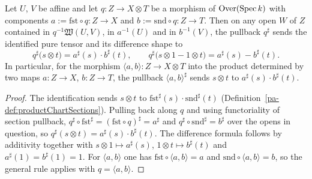 \begin{theorem}
  \label{pa-thm:appLE_productChartSections}
  \leanok

  Let \(U\), \(V\) be affine and let \(q \colon Z \to X \otimes T\) be a morphism of
  \(\mathrm{Over}(\operatorname{Spec} k)\) with components \(a := \mathrm{fst} \circ q \colon Z \to X\) and
  \(b := \mathrm{snd} \circ q \colon Z \to T\). Then on any open \(W\) of \(Z\) contained in
  \(q^{-1}\mathfrak W(U,V)\), in \(a^{-1}(U)\) and in \(b^{-1}(V)\), the pullback \(q^\sharp\)
  sends the identified pure tensor and its difference shape to
  \[
    q^\sharp\bigl(s \otimes t\bigr) = a^\sharp(s) \cdot b^\sharp(t), \qquad
    q^\sharp\bigl(s \otimes 1 - 1 \otimes t\bigr) = a^\sharp(s) - b^\sharp(t).
  \]
  In particular, for the morphism \(\langle a, b\rangle \colon Z \to X \otimes T\) into the
  product determined by two maps \(a \colon Z \to X\), \(b \colon Z \to T\), the pullback
  \(\langle a, b\rangle^\sharp\) sends \(s \otimes t\) to \(a^\sharp(s) \cdot b^\sharp(t)\).
\end{theorem}
\begin{proof}
  \leanok
  The identification sends \(s \otimes t\) to
  \(\mathrm{fst}^\sharp(s) \cdot \mathrm{snd}^\sharp(t)\)
  (Definition~\ref{pa-def:productChartSections}). Pulling back along \(q\) and using functoriality
  of section pullback, \(q^\sharp \circ \mathrm{fst}^\sharp = (\mathrm{fst} \circ q)^\sharp = a^\sharp\)
  and \(q^\sharp \circ \mathrm{snd}^\sharp = b^\sharp\) over the opens in question, so
  \(q^\sharp(s \otimes t) = a^\sharp(s) \cdot b^\sharp(t)\). The difference formula follows by
  additivity together with \(s \otimes 1 \mapsto a^\sharp(s)\), \(1 \otimes t \mapsto b^\sharp(t)\)
  and \(a^\sharp(1) = b^\sharp(1) = 1\). For \(\langle a,b\rangle\) one has
  \(\mathrm{fst} \circ \langle a,b\rangle = a\) and \(\mathrm{snd} \circ \langle a,b\rangle = b\),
  so the general rule applies with \(q = \langle a, b\rangle\).
\end{proof}

